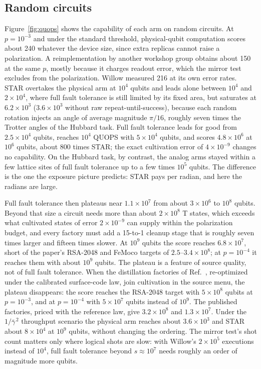 \documentclass[11pt]{article}
\begin{document}
\subsection{Random circuits}\label{sec:quops-results}
Figure~\ref{fig:quops} shows the capability of each arm on random circuits. At $p=10^{-3}$ and under the standard threshold,
physical-qubit computation scores about 240 whatever the device size, since
extra replicas cannot raise a polarization. A reimplementation by another
workshop group obtains about 150 at the same $p$, mostly because it charges
readout error, which the mirror test excludes from the polarization. Willow
measured 216 at its own error rates. STAR overtakes the physical arm at $10^4$
qubits and leads alone between $10^4$ and $2\times10^4$, where full fault
tolerance is still limited by its fixed area, but saturates at $6.2\times10^3$
($3.6\times10^3$ without raw repeat-until-success), because each random rotation injects
an angle of average magnitude $\pi/16$, roughly seven times the Trotter angles
of the Hubbard task. Full fault tolerance leads for good
from $2.5\times10^4$ qubits, reaches $10^4$ QUOPS with $5\times10^4$ qubits, and
scores $4.8\times10^6$ at $10^6$ qubits, about 800 times STAR; the exact
cultivation error of $4\times10^{-9}$ changes no capability. On the Hubbard
task, by contrast, the analog arms stayed within a few lattice sites of full
fault tolerance up to a few times $10^5$ qubits. The difference is the one the
exposure picture predicts: STAR pays per radian, and here the radians are
large.

Full fault tolerance then plateaus near $1.1\times10^7$ from about $3\times10^6$
to $10^8$ qubits. Beyond that size a circuit needs more than about $2\times10^8$
T states, which exceeds what cultivated states of error $2\times10^{-9}$ can
supply within the polarization budget, and every factory must add a 15-to-1
cleanup stage that is roughly seven times larger and fifteen times slower. At
$10^9$ qubits the score reaches $6.8\times10^7$, short of the paper's RSA-2048
and FeMoco targets of $2.5$--$3.4\times10^8$; at $p=10^{-4}$ it reaches them with
about $10^9$ qubits. The plateau is a feature of source quality, not of
full fault tolerance. When the distillation factories of
Ref.~\cite{litinski2019magic}, re-optimized under the calibrated surface-code
law, join cultivation in the source menu, the plateau disappears: the score
reaches the RSA-2048 target with $5\times10^8$ qubits at $p=10^{-3}$, and at
$p=10^{-4}$ with $5\times10^7$ qubits instead of $10^9$. The published factories,
priced with the reference law, give $3.2\times10^8$ and $1.3\times10^7$.
Under the $1/\bar\gamma^{\,2}$ throughput scenario the physical arm reaches about
$3.6\times10^3$ and STAR about $8\times10^4$ at $10^9$ qubits, without changing the
ordering. The mirror test's shot count matters only where logical shots are
slow: with Willow's $2\times10^5$ executions instead of $10^4$, full fault
tolerance beyond $s\approx10^7$ needs roughly an order of magnitude more qubits.
\end{document}
